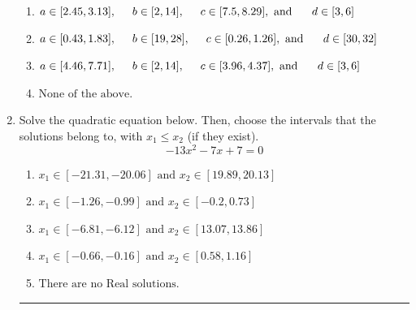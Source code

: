 \documentclass[14pt]{extbook}
\newcommand{\litem}[1]{\item#1\hspace*{-1cm}\rule{\textwidth}{0.4pt}}
\begin{document}
\begin{enumerate}
{\begin{enumerate}[label=\Alph*.]
\item \( a \in [2.45, 3.13], \hspace*{5mm} b \in [2, 14], \hspace*{5mm} c \in [7.5, 8.29], \text{ and } \hspace*{5mm} d \in [3, 6] \)
\item \( a \in [0.43, 1.83], \hspace*{5mm} b \in [19, 28], \hspace*{5mm} c \in [0.26, 1.26], \text{ and } \hspace*{5mm} d \in [30, 32] \)
\item \( a \in [4.46, 7.71], \hspace*{5mm} b \in [2, 14], \hspace*{5mm} c \in [3.96, 4.37], \text{ and } \hspace*{5mm} d \in [3, 6] \)
\item \( \text{None of the above.} \)

\end{enumerate} }
\litem{
Solve the quadratic equation below. Then, choose the intervals that the solutions belong to, with $x_1 \leq x_2$ (if they exist).\[ -13x^{2} -7 x + 7 = 0 \]\begin{enumerate}[label=\Alph*.]
\item \( x_1 \in [-21.31, -20.06] \text{ and } x_2 \in [19.89, 20.13] \)
\item \( x_1 \in [-1.26, -0.99] \text{ and } x_2 \in [-0.2, 0.73] \)
\item \( x_1 \in [-6.81, -6.12] \text{ and } x_2 \in [13.07, 13.86] \)
\item \( x_1 \in [-0.66, -0.16] \text{ and } x_2 \in [0.58, 1.16] \)
\item \( \text{There are no Real solutions.} \)


\end{enumerate}}
\end{enumerate}
\end{document}
